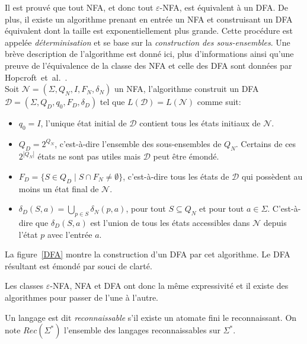 	Il est prouvé que tout NFA, et donc tout $\varepsilon$-NFA, est équivalent à un DFA. De plus, il existe un algorithme prenant en entrée un NFA et construisant un DFA équivalent dont la taille est exponentiellement plus grande. Cette procédure est appelée \emph{déterminisation} et se base sur la \emph{construction des sous-ensembles}. Une brève description de l'algorithme est donné ici, plus d'informations ainsi qu'une preuve de l'équivalence de la classe des NFA et celle des DFA sont données par Hopcroft~et~al.~\cite{Hop06}. \\
	
	Soit $\mathscr{N} = (\Sigma,Q_N,I,F_N,\delta_N)$ un NFA, l'algorithme construit un DFA $\mathscr{D} = (\Sigma, Q_D, q_0, F_D, \delta_D)$ tel que $L(\mathscr{D}) = L(\mathscr{N})$ comme suit:
		
	\begin{itemize}
		\item $q_0 = I$, l'unique état initial de $\mathscr{D}$ contient tous les états initiaux de $\mathscr{N}$.
		\item $Q_D = 2^{Q_N}$, c'est-à-dire l'ensemble des sous-ensembles de $Q_N$. Certains de ces $2^{|Q_N|}$ états ne sont pas utiles mais $\mathscr{D}$ peut être émondé.
		\item $F_D = \{S \in Q_D\mid S \cap F_N \neq \emptyset\}$, c'est-à-dire tous les états de $\mathscr{D}$ qui possèdent au moins un état final de $\mathscr{N}$.
		\item $\delta_D(S,a) = \bigcup_{p \in S} \delta_N(p,a)$, pour tout $S \subseteq Q_N$ et pour tout $a \in \Sigma$. C'est-à-dire que $\delta_D(S,a)$ est l'union de tous les états accessibles dans $\mathscr{N}$ depuis l'état $p$ avec l'entrée $a$.
	\end{itemize}

	La figure~\ref{DFA} montre la construction d'un DFA par cet algorithme. Le DFA résultant est émondé par souci de clarté.

	

	Les classes $\varepsilon$-NFA, NFA et DFA ont donc la même expressivité et il existe des algorithmes pour passer de l'une à l'autre. \\

	\begin{definition}
		Un langage est dit \emph{reconnaissable} s'il existe un atomate fini le reconnaissant. On note $Rec(\Sigma^*)$ l'ensemble des langages reconnaissables sur $\Sigma^*$. \\
	\end{definition}
	
